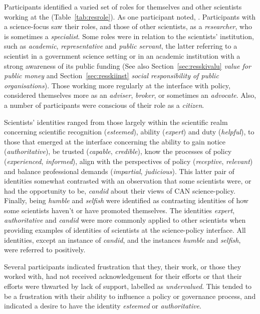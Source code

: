 Participants identified a varied set of roles for themselves and other scientists working at the \SPI (Table~\ref{tab:resrole}). As one participant noted, . Participants with a science-focus saw their roles, and those of other scientists, as a \emph{researcher}, who is sometimes a \emph{specialist}. Some roles were in relation to the scientists' institution, such as \emph{academic}, \emph{representative} and \emph{public servant}, the latter referring to a scientist in a government science setting or in an academic institution with a strong awareness of its public funding (See also Section~\ref{sec:resskivalu} \emph{value for public money} and Section~\ref{sec:resskiinst} \emph{social responsibility of public organisations}). Those working more regularly at the interface with policy, considered themselves more as an \emph{adviser}, \emph{broker}, or sometimes an \emph{advocate}. Also, a number of participants were conscious of their role as a \emph{citizen}.

Scientists' identities ranged from those largely within the scientific realm concerning scientific recognition (\emph{esteemed}), ability (\emph{expert}) and duty (\emph{helpful}), to those that emerged at the interface concerning the ability to gain notice (\emph{authoritative}), be trusted (\emph{capable}, \emph{credible}), know the processes of policy (\emph{experienced}, \emph{informed}), align with the perspectives of policy (\emph{receptive}, \emph{relevant}) and balance professional demands (\emph{impartial}, \emph{judicious}). This latter pair of identities somewhat contrasted with an observation that some scientists were, or had the opportunity to be, \emph{candid} about their views of CAN science-policy. Finally, being \emph{humble} and \emph{selfish} were identified as contrasting identities of how some scientists haven't or have promoted themselves. The identities \emph{expert}, \emph{authoritative} and \emph{candid} were more commonly applied to other scientists when providing examples of identities of scientists at the science-policy interface. All identities, except an instance of \emph{candid}, and the instances \emph{humble} and \emph{selfish}, were referred to positively.

Several participants indicated frustration that they, their work, or those they worked with, had not received acknowledgement for their efforts or that their efforts were thwarted by lack of support, labelled as \emph{undervalued}. This tended to be a frustration with their ability to influence a policy or governance process, and indicated a desire to have the identity \emph{esteemed} or \emph{authoritative}.

